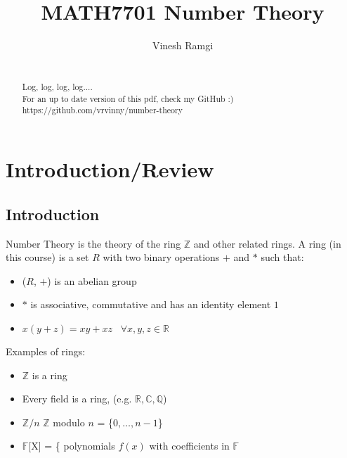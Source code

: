 \documentclass[11pt]{article}
\begin{document}
\newtheorem{theorem}{Theorem}[section]
\newtheorem{definition}[theorem]{Definition}
\newtheorem{proposition}[theorem]{Proposition}
\newtheorem{corollary}[theorem]{Corollary}
\newtheorem{lemma}[theorem]{Lemma}

\title{MATH7701 Number Theory}
\author{Vinesh Ramgi}
	\maketitle


\newpage
	\begin{abstract}

		\\[1em]
		Log, log, log, log....\\[2em]

		For an up to date version of this pdf, check my GitHub :)\\[0.5em]
https://github.com/vrvinny/number-theory

	\end{abstract}
\newpage
\tableofcontents{}
\newpage
	\section{Introduction/Review}
	\subsection{Introduction}
	Number Theory is the theory of the ring $\mathbb{Z}$ and other related rings. A ring (in this course) is a set $R$ with two binary operations $+$ and $*$ such that:
	\begin{itemize}
		\item ($R$, $+$) is an abelian group
		\item $*$ is associative, commutative and has an identity element $1$
		\item $x(y+z) = xy + xz \hspace{10pt} \forall x,y,z \in \mathbb{R} $

	\end{itemize}
Examples of rings:
	\begin{itemize}
		\item $\mathbb{Z}$ is a ring
		\item Every field is a ring, (e.g. $\mathbb{R}, \mathbb{C}, \mathbb{Q}$)
		\item $\mathbb{Z}/n$ \hspace{10pt} $\mathbb{Z}$ modulo $n$ = \{$0, \dots, n-1$\}
		\item $\mathbb{F}$[X] = \{ polynomials $f(x)$ with coefficients in $\mathbb{F}$


	\end{itemize}
\end{document}
